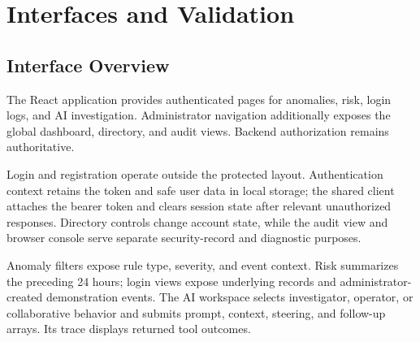 \chapter{Interfaces and Validation}
\section{Interface Overview}
The React application provides authenticated pages for anomalies, risk, login logs, and AI investigation. Administrator navigation additionally exposes the global dashboard, directory, and audit views. Backend authorization remains authoritative.

Login and registration operate outside the protected layout. Authentication context retains the token and safe user data in local storage; the shared client attaches the bearer token and clears session state after relevant unauthorized responses. Directory controls change account state, while the audit view and browser console serve separate security-record and diagnostic purposes.

Anomaly filters expose rule type, severity, and event context. Risk summarizes the preceding 24 hours; login views expose underlying records and administrator-created demonstration events. The AI workspace selects investigator, operator, or collaborative behavior and submits prompt, context, steering, and follow-up arrays. Its trace displays returned tool outcomes.



